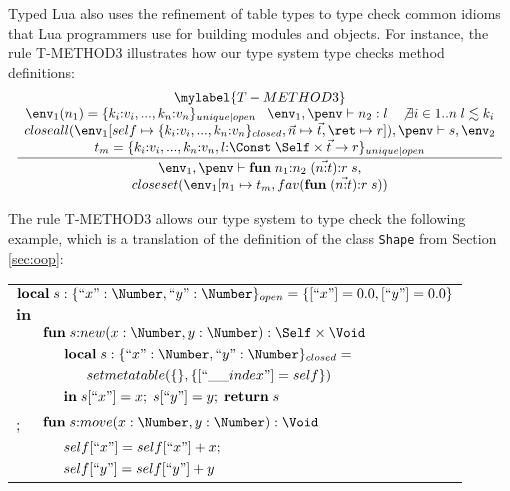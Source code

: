 Typed Lua also uses the refinement of table types to type check
common idioms that Lua programmers use for building modules and objects.
For instance, the rule \textsc{T-METHOD3} illustrates how our type system
type checks method definitions:
\[
\begin{array}{c}
\mylabel{T-METHOD3}\\
\dfrac{\begin{array}{c}
       \env_{1}(n_{1}) = \{k_{i}{:}v_{i}, ..., k_{n}{:}v_{n}\}_{unique|open} \;\;\;
       \env_{1}, \penv \vdash n_{2} : l \;\;\;
       \not \exists i \in 1..n \; l \lesssim k_{i}\\
       closeall(\env_{1}[self \mapsto \{k_{i}{:}v_{i}, ..., k_{n}{:}v_{n}\}_{closed}, \vec{n} \mapsto \vec{t}, \ret \mapsto r]), \penv \vdash s, \env_{2}\\
       t_{m} = \{k_{i}{:}v_{i}, ..., k_{n}{:}v_{n}, l{:}\Const \; \Self \times \vec{t} \rightarrow r\}_{unique|open}
       \end{array}}
      {\begin{array}{c}
       \env_{1}, \penv \vdash \mathbf{fun} \; n_{1}{:}n_{2} \; (\vec{n{:}t}){:}r \; s,\\
       closeset(\env_{1}[n_{1} \mapsto t_{m}, fav(\mathbf{fun} \; (\vec{n{:}t}){:}r \; s))
       \end{array}}
\end{array}
\]

The rule \textsc{T-METHOD3} allows our type system to type check the
following example, which is a translation of the definition of the class
\texttt{Shape} from Section \ref{sec:oop}:
\begin{center}
\begin{tabular}{llll}
\multicolumn{4}{l}{$\mathbf{local} \; s:\{``x":\Number, ``y":\Number\}_{open} = \{ [``x"] = 0.0, [``y"] = 0.0 \}$}\\
\multicolumn{4}{l}{$\mathbf{in}$}\\
& \multicolumn{3}{l}{$\mathbf{fun} \; s{:}new (x:\Number, y:\Number):\Self \times \Void$}\\
& & \multicolumn{2}{l}{$\mathbf{local} \; s:\{``x":\Number, ``y":\Number\}_{closed} =$}\\
& & & \multicolumn{1}{l}{$setmetatable(\{\}, \{ [``\string_\string_index"] = self \})$}\\
& & \multicolumn{2}{l}{$\mathbf{in} \; s[``x"] = x; \; s[``y"] = y; \; \mathbf{return} \; s$}\\
; & \multicolumn{3}{l}{$\mathbf{fun} \; s{:}move (x:\Number, y:\Number):\Void$}\\
& & \multicolumn{2}{l}{$self[``x"] = self[``x"] + x;$}\\
& & \multicolumn{2}{l}{$self[``y"] = self[``y"] + y$}
\end{tabular}
\end{center}

